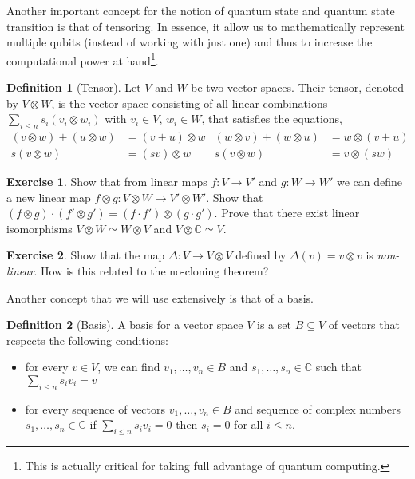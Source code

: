 \documentclass[a4paper, 11pt]{article}
\newcommand{\complex}{\mathbb{C}}
\theoremstyle{definition}
\newtheorem{definition}{Definition}
\newtheorem{exercise}{Exercise}
\begin{document}
Another important concept for the notion of quantum state and quantum
state transition is that of tensoring. In essence, it allow us to
mathematically represent multiple qubits (instead of working with just
one) and thus to increase the computational power at
hand\footnote{This is actually critical for taking full advantage of
  quantum computing.}.

\begin{definition}[Tensor]
  Let $V$ and $W$ be two vector spaces. Their tensor, denoted by
  $V \otimes W$, is the vector space consisting of all linear
  combinations $\sum_{i \leq n} s_i  (v_i \otimes w_i)$ with
  $v_i \in V$, $w_i \in W$, that satisfies the equations,
  \begin{align*}
   (v \otimes w) + (u \otimes w) & = (v + u) \otimes w &
   (w \otimes v) + (w \otimes u) & = w \otimes (v + u) \\
   s  (v \otimes w) & = (s v) \otimes w &
   s  (v \otimes w) & = v \otimes (s w)
  \end{align*} 
\end{definition}

\begin{exercise}
  Show that from linear maps $f : V \to V'$ and $g : W \to W'$ we can
  define a new linear map
  $f \otimes g : V \otimes W \to V' \otimes W'$. Show that
  $(f \otimes g) \cdot (f' \otimes g') = (f \cdot f' ) \otimes (g
  \cdot g')$. Prove that there exist linear isomorphisms
  $V \otimes W \simeq W \otimes V$ and $V \otimes \complex \simeq V$.
\end{exercise}

\begin{exercise}
  Show that the map $\Delta : V \to V \otimes V$ defined by
  $\Delta(v) = v \otimes v$ is \emph{non-linear}. How is this related
  to the no-cloning theorem?
\end{exercise}

Another concept that we will use extensively is that of a basis.

\begin{definition}[Basis]
  A basis for a vector space $V$ is a set $B \subseteq V$ of vectors that
  respects the following conditions:
  \begin{itemize}
  \item for every $v \in V$, we can find $v_1,\dots,v_n \in B$ and
    $s_1,\dots,s_n \in \complex$ such that
    $\sum_{i \leq n} s_i v_i = v$
  \item for every sequence of vectors $v_1,\dots,v_n \in B$ and
    sequence of complex numbers $s_1,\dots,s_n \in \complex$ if
    $\sum_{i \leq n} s_i  v_i = 0$ then $s_i = 0$ for all
    $i \leq n$.
  \end{itemize}
\end{definition}
\end{document}
